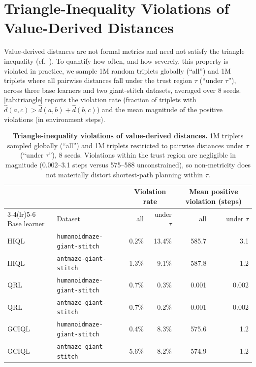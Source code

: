 \documentclass{article} %
\begin{document}
\section{Triangle-Inequality Violations of Value-Derived Distances} \label{apdx:triangle}

Value-derived distances are not formal metrics and need not satisfy the triangle inequality (cf.\ ). To quantify how often, and how severely, this property is violated in practice, we sample 1M random triplets globally (``all'') and 1M triplets where all pairwise distances fall under the trust region $\tau$ (``under $\tau$''), across three base learners and two giant-stitch datasets, averaged over 8 seeds. \autoref{tab:triangle} reports the violation rate (fraction of triplets with $\hat d(a,c) > \hat d(a,b) + \hat d(b,c)$) and the mean magnitude of the positive violations (in environment steps).

\begin{table}[H]
    \centering
    \small
    \caption{\textbf{Triangle-inequality violations of value-derived distances.} 1M triplets sampled globally (``all'') and 1M triplets restricted to pairwise distances under $\tau$ (``under $\tau$''), 8 seeds. Violations within the trust region are negligible in magnitude (0.002--3.1 steps versus 575--588 unconstrained), so non-metricity does not materially distort shortest-path planning within $\tau$.}
    \label{tab:triangle}
    \begin{tabular*}{\linewidth}{@{\extracolsep{\fill}}llrrrr}
        \toprule
         & & \multicolumn{2}{c}{Violation rate} & \multicolumn{2}{c}{Mean positive violation (steps)} \\
         \cmidrule(lr){3-4}\cmidrule(lr){5-6}
        Base learner & Dataset & all & under $\tau$ & all & under $\tau$ \\
        \midrule
        HIQL  & \texttt{humanoidmaze-giant-stitch} & 0.2\% & 13.4\% & 585.7 & 3.1 \\
        HIQL  & \texttt{antmaze-giant-stitch}      & 1.3\% & 9.1\%  & 587.8 & 1.2 \\
        QRL   & \texttt{humanoidmaze-giant-stitch} & 0.7\% & 0.3\%  & 0.001 & 0.002 \\
        QRL   & \texttt{antmaze-giant-stitch}      & 0.7\% & 0.2\%  & 0.001 & 0.002 \\
        GCIQL & \texttt{humanoidmaze-giant-stitch} & 0.4\% & 8.3\%  & 575.6 & 1.2 \\
        GCIQL & \texttt{antmaze-giant-stitch}      & 5.6\% & 8.2\%  & 574.9 & 1.2 \\
        \bottomrule
    \end{tabular*}
\end{table}
\end{document}
